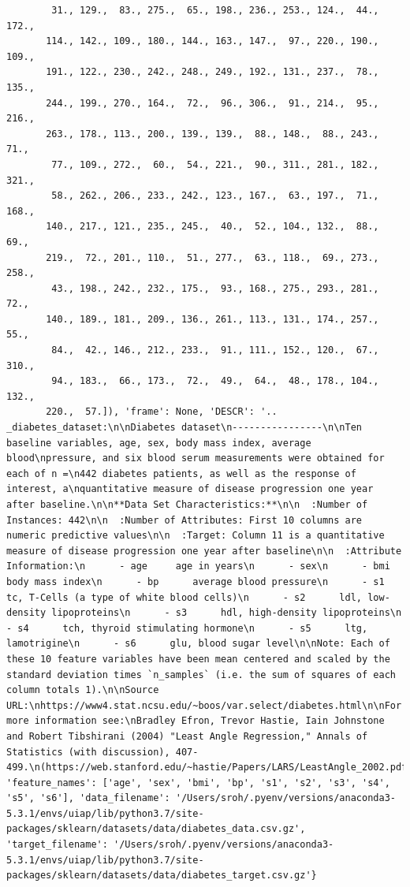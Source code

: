 \documentclass[11pt]{article}
\begin{document}
\begin{verbatim}
        31., 129.,  83., 275.,  65., 198., 236., 253., 124.,  44., 172.,
       114., 142., 109., 180., 144., 163., 147.,  97., 220., 190., 109.,
       191., 122., 230., 242., 248., 249., 192., 131., 237.,  78., 135.,
       244., 199., 270., 164.,  72.,  96., 306.,  91., 214.,  95., 216.,
       263., 178., 113., 200., 139., 139.,  88., 148.,  88., 243.,  71.,
        77., 109., 272.,  60.,  54., 221.,  90., 311., 281., 182., 321.,
        58., 262., 206., 233., 242., 123., 167.,  63., 197.,  71., 168.,
       140., 217., 121., 235., 245.,  40.,  52., 104., 132.,  88.,  69.,
       219.,  72., 201., 110.,  51., 277.,  63., 118.,  69., 273., 258.,
        43., 198., 242., 232., 175.,  93., 168., 275., 293., 281.,  72.,
       140., 189., 181., 209., 136., 261., 113., 131., 174., 257.,  55.,
        84.,  42., 146., 212., 233.,  91., 111., 152., 120.,  67., 310.,
        94., 183.,  66., 173.,  72.,  49.,  64.,  48., 178., 104., 132.,
       220.,  57.]), 'frame': None, 'DESCR': '.. _diabetes_dataset:\n\nDiabetes dataset\n----------------\n\nTen baseline variables, age, sex, body mass index, average blood\npressure, and six blood serum measurements were obtained for each of n =\n442 diabetes patients, as well as the response of interest, a\nquantitative measure of disease progression one year after baseline.\n\n**Data Set Characteristics:**\n\n  :Number of Instances: 442\n\n  :Number of Attributes: First 10 columns are numeric predictive values\n\n  :Target: Column 11 is a quantitative measure of disease progression one year after baseline\n\n  :Attribute Information:\n      - age     age in years\n      - sex\n      - bmi     body mass index\n      - bp      average blood pressure\n      - s1      tc, T-Cells (a type of white blood cells)\n      - s2      ldl, low-density lipoproteins\n      - s3      hdl, high-density lipoproteins\n      - s4      tch, thyroid stimulating hormone\n      - s5      ltg, lamotrigine\n      - s6      glu, blood sugar level\n\nNote: Each of these 10 feature variables have been mean centered and scaled by the standard deviation times `n_samples` (i.e. the sum of squares of each column totals 1).\n\nSource URL:\nhttps://www4.stat.ncsu.edu/~boos/var.select/diabetes.html\n\nFor more information see:\nBradley Efron, Trevor Hastie, Iain Johnstone and Robert Tibshirani (2004) "Least Angle Regression," Annals of Statistics (with discussion), 407-499.\n(https://web.stanford.edu/~hastie/Papers/LARS/LeastAngle_2002.pdf)', 'feature_names': ['age', 'sex', 'bmi', 'bp', 's1', 's2', 's3', 's4', 's5', 's6'], 'data_filename': '/Users/sroh/.pyenv/versions/anaconda3-5.3.1/envs/uiap/lib/python3.7/site-packages/sklearn/datasets/data/diabetes_data.csv.gz', 'target_filename': '/Users/sroh/.pyenv/versions/anaconda3-5.3.1/envs/uiap/lib/python3.7/site-packages/sklearn/datasets/data/diabetes_target.csv.gz'}
\end{verbatim}
\end{document}
